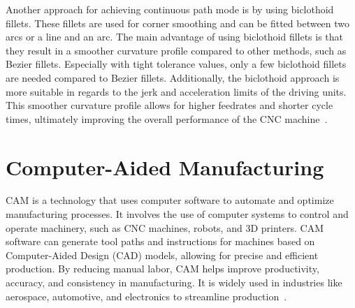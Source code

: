 

Another approach for achieving continuous path mode is by using biclothoid fillets. These fillets are used for corner smoothing and can be fitted between two arcs or a line and an arc. The main advantage of using biclothoid fillets is that they result in a smoother curvature profile compared to other methods, such as Bezier fillets. Especially with tight tolerance values, only a few biclothoid fillets are needed compared to Bezier fillets. Additionally, the biclothoid approach is more suitable in regards to the jerk and acceleration limits of the driving units. This smoother curvature profile allows for higher feedrates and shorter cycle times, ultimately improving the overall performance of the CNC machine~\cite{Shahzadeh.2018}. 






\newpage
\section{Computer-Aided Manufacturing}\label{CAMmain}

CAM is a technology that uses computer software to automate and optimize manufacturing processes. It involves the use of computer systems to control and operate machinery, such as CNC machines, robots, and 3D printers. CAM software can generate tool paths and instructions for machines based on Computer-Aided Design (CAD) models, allowing for precise and efficient production. By reducing manual labor, CAM helps improve productivity, accuracy, and consistency in manufacturing. It is widely used in industries like aerospace, automotive, and electronics to streamline production~\cite{Bi.2021}.%


